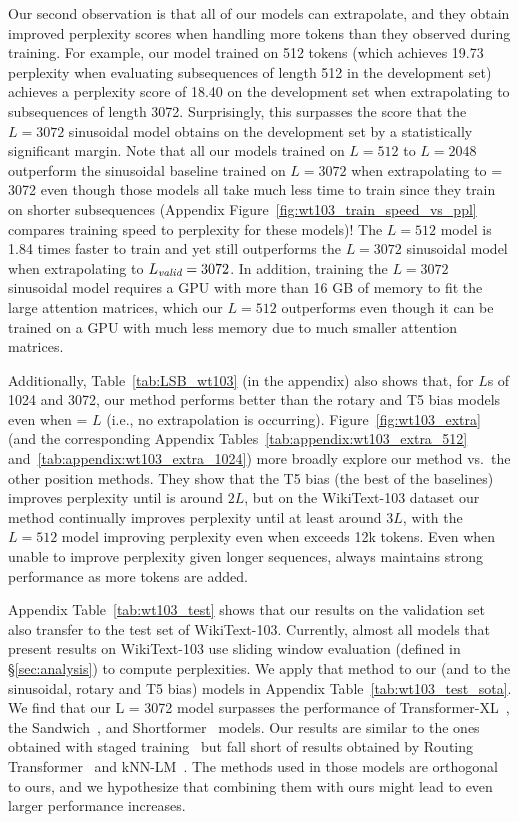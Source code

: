Our second observation is that all of our models can extrapolate, and they obtain improved perplexity scores when handling more tokens than they observed during training. For example, our model trained on 512 tokens (which achieves 19.73 perplexity when evaluating subsequences of length 512 in the development set) achieves a perplexity score of 18.40 on the development set when extrapolating to subsequences of length 3072. Surprisingly, this surpasses the score that the $L=3072$ sinusoidal model obtains on the development set by a statistically significant margin. 
Note that all our models trained on $L=512$ to $L=2048$ outperform the sinusoidal baseline trained on $L=3072$ when extrapolating to \li = 3072 even though those models all take much less time to train since they train on shorter subsequences (Appendix Figure~\ref{fig:wt103_train_speed_vs_ppl} compares training speed to perplexity for these models)! The $L=512$ model is 1.84 times faster to train and yet still outperforms the $L=3072$ sinusoidal model when extrapolating to $L_{\textit{valid}} = 3072$. In addition, training the $L=3072$ sinusoidal model requires a GPU with more than 16 GB of memory to fit the large attention matrices, which our $L=512$ outperforms even though it can be trained on a GPU with much less memory due to much smaller attention matrices. 

Additionally,  Table~\ref{tab:LSB_wt103} (in the appendix) also shows that, for $L$s  of 1024 and 3072, our method performs better than the rotary and T5 bias models even when \li = $L$ (i.e., no extrapolation is occurring).
Figure~\ref{fig:wt103_extra} (and the corresponding Appendix Tables~\ref{tab:appendix:wt103_extra_512} and~\ref{tab:appendix:wt103_extra_1024}) more broadly explore our method vs.~the other position methods. They show that the T5 bias (the best of the baselines) improves perplexity until \li is around $2L$, but on the WikiText-103 dataset our method continually improves perplexity until at least around $3L$, with the $L=512$ model improving perplexity even when \li exceeds 12k tokens. Even when unable to improve perplexity given longer sequences, \al always maintains strong performance as more tokens are added. 



Appendix Table~\ref{tab:wt103_test} shows that our results on the validation set also transfer to the test set of WikiText-103.
Currently, almost all models that present results on WikiText-103 use sliding window evaluation  (defined in \S\ref{sec:analysis}) to compute perplexities. We apply that method to our (and to the sinusoidal, rotary and T5 bias) models in Appendix Table~\ref{tab:wt103_test_sota}. We find that our L = 3072 model surpasses the performance of Transformer-XL~\citep{transformer-xl}, the Sandwich~\citep{sandwich}, and Shortformer~\citep{shortformer} models. Our results are similar to the ones obtained with staged training~\citep{shortformer} but fall short of results obtained by Routing Transformer~\citep{roy2020efficient} and kNN-LM~\citep{khandelwal20generalization}. The methods used in those models are orthogonal to ours, and we hypothesize that combining them with ours might lead to even larger performance increases. 


